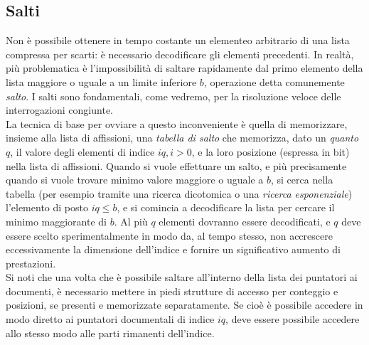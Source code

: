 \subsection{Salti}
Non è possibile ottenere in tempo costante un elementeo arbitrario di una lista compressa per scarti: è necessario decodificare gli elementi precedenti. In realtà, più problematica è l'impossibilità di saltare rapidamente dal primo elemento della lista maggiore o uguale a un limite inferiore $b$, operazione detta comunemente \textit{salto}. I salti sono fondamentali, come vedremo, per la risoluzione veloce delle interrogazioni congiunte.\\
La tecnica di base per ovviare a questo inconveniente è quella di memorizzare, insieme alla lista di affissioni, una \textit{tabella di salto} che memorizza, dato un \textit{quanto} $q$, il valore degli elementi di indice $iq, i > 0$, e la loro posizione (espressa in bit) nella lista di affissioni. Quando si vuole effettuare un salto, e più precisamente quando si vuole trovare minimo valore maggiore o uguale a $b$, si cerca nella tabella (per esempio tramite una ricerca dicotomica o una \textit{ricerca esponenziale}) l'elemento di posto $iq \leq b$, e si comincia a decodificare la lista per cercare il minimo maggiorante di $b$. Al più $q$ elementi dovranno essere decodificati, e $q$ deve essere scelto sperimentalmente in modo da, al tempo stesso, non accrescere eccessivamente la dimensione dell'indice e fornire un significativo aumento di prestazioni.\\
Si noti che una volta che è possibile saltare all'interno della lista dei puntatori ai documenti, è necessario mettere in piedi strutture di accesso per conteggio e posizioni, se presenti e memorizzate separatamente. Se cioè è possibile accedere in modo diretto ai puntatori documentali di indice $iq$, deve essere possibile accedere allo stesso modo alle parti rimanenti dell'indice.